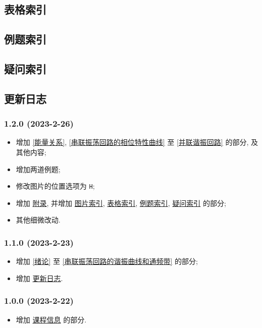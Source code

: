 \documentclass{notes}
\begin{document}
\subsection{表格索引} \label{表格索引}
\makeatletter
{}
\makeatother

\subsection{例题索引} \label{例题索引}
\listofexampleprobs

\subsection{疑问索引} \label{疑问索引}
\listofquestions

\subsection{更新日志} \label{更新日志}
\subsubsection*{1.2.0 (2023-2-26)}
\begin{itemize}
    \item 增加 \ref{能量关系}, \ref{串联振荡回路的相位特性曲线} 至 \ref{并联谐振回路} 的部分, 及其他内容;
    \item 增加两道例题;
    \item 修改图片的位置选项为 \texttt{H};
    \item 增加 \hyperref[附录]{附录}, 并增加 \hyperref[图片索引]{图片索引}, \hyperref[表格索引]{表格索引}, \hyperref[例题索引]{例题索引}, \hyperref[疑问索引]{疑问索引} 的部分;
    \item 其他细微改动.
\end{itemize}

\subsubsection*{1.1.0 (2023-2-23)}
\begin{itemize}
    \item 增加 \ref{绪论} 至 \ref{串联振荡回路的谐振曲线和通频带} 的部分;
    \item 增加 \hyperref[更新日志]{更新日志}.
\end{itemize}

\subsubsection*{1.0.0 (2023-2-22)}
\begin{itemize}
    \item 增加 \hyperref[课程信息]{课程信息} 的部分.
\end{itemize}
\end{document}
